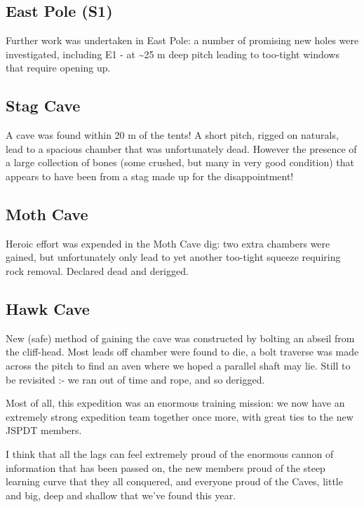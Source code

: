 \hypertarget{east-pole-s1}{%
\subsection{East Pole (S1)}\label{east-pole-s1}}

Further work was undertaken in East Pole: a number of promising new
holes were investigated, including E1 - at \textasciitilde{}25 m deep
pitch leading to too-tight windows that require opening up.

\hypertarget{stag-cave}{%
\subsection{Stag Cave}\label{stag-cave}}

A cave was found within 20 m of the tents! A short pitch, rigged on
naturals, lead to a spacious chamber that was unfortunately dead.
However the presence of a large collection of bones (some crushed, but
many in very good condition) that appears to have been from a stag made
up for the disappointment!

\hypertarget{moth-cave}{%
\subsection{Moth Cave}\label{moth-cave}}

Heroic effort was expended in the Moth Cave dig: two extra chambers were
gained, but unfortunately only lead to yet another too-tight squeeze
requiring rock removal. Declared dead and derigged.

\hypertarget{hawk-cave}{%
\subsection{Hawk Cave}\label{hawk-cave}}

New (safe) method of gaining the cave was constructed by bolting an
abseil from the cliff-head. Most leads off chamber were found to die, a
bolt traverse was made across the pitch to find an aven where we hoped a
parallel shaft may lie. Still to be revisited :- we ran out of time and
rope, and so derigged.

Most of all, this expedition was an enormous training mission: we now
have an extremely strong expedition team together once more, with great
ties to the new JSPDT members.

I think that all the lags can feel extremely proud of the enormous
cannon of information that has been passed on, the new members proud of
the steep learning curve that they all conquered, and everyone proud of
the Caves, little and big, deep and shallow that we've found this year.

